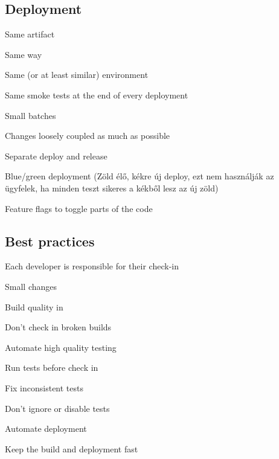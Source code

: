 \documentclass[a4paper,14pt, twocolumn]{extarticle}
\begin{document}
		\subsection{Deployment}
			\begin{compactitem}
				\item Same artifact 
				\item Same way 
				\item Same (or at least similar) environment 
				\item Same smoke tests at the end of every deployment 
				\item Small batches 
				\item Changes loosely coupled as much as possible 
				\item Separate deploy and release
				\begin{compactitem}
					\item Blue/green deployment (Zöld élő, kékre új deploy, ezt nem használják az ügyfelek, ha minden teszt sikeres a kékből lesz az új zöld)
					\item Feature flags to toggle parts of the code
				\end{compactitem}
			\end{compactitem}
		\subsection{Best practices}
		\begin{compactitem}
			\item Each developer is responsible for their check-in 
			\item Small changes 
			\item Build quality in 
			\item Don’t check in broken builds 
			\item Automate high quality testing 
			\item Run tests before check in 
			\item Fix inconsistent tests 
			\item Don’t ignore or disable tests 
			\item Automate deployment 
			\item Keep the build and deployment fast
		\end{compactitem}
		\onecolumn
\end{document}
